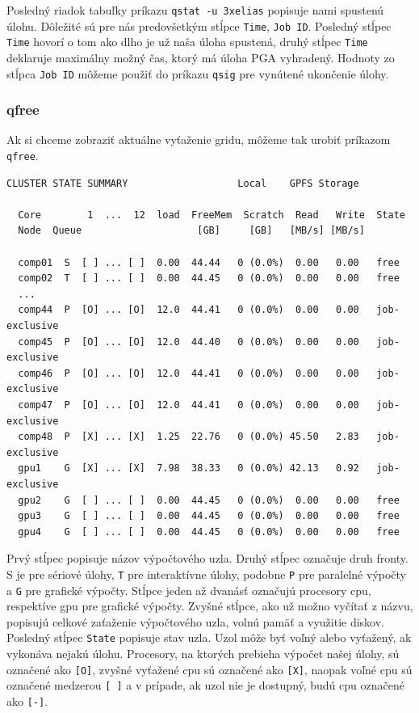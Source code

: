 Posledný riadok tabuľky príkazu \texttt{qstat -u 3xelias} popisuje nami spustenú úlohu.
Dôležité sú pre nás predovšetkým stĺpce \texttt{Time}, \texttt{Job ID}.
Posledný stĺpec \texttt{Time} hovorí o tom ako dlho je už naša úloha spustená, druhý stĺpec \texttt{Time} deklaruje maximálny možný čas,
ktorý má úloha PGA vyhradený. Hodnoty zo stĺpca \texttt{Job ID} môžeme použiť do príkazu \texttt{qsig} pre vynútené ukončenie úlohy.

\subsubsection{qfree}
Ak si chceme zobraziť aktuálne vyťaženie gridu, môžeme tak urobiť príkazom \texttt{qfree}.

\begin{lstlisting}[caption={qfree}]
  CLUSTER STATE SUMMARY                   Local    GPFS Storage
  
  Core        1  ...  12  load  FreeMem  Scratch  Read   Write  State
  Node  Queue                    [GB]     [GB]   [MB/s] [MB/s]
  
  comp01  S  [ ] ... [ ]  0.00  44.44   0 (0.0%)  0.00   0.00   free
  comp02  T  [ ] ... [ ]  0.00  44.45   0 (0.0%)  0.00   0.00   free
  ...
  comp44  P  [O] ... [O]  12.0  44.41   0 (0.0%)  0.00   0.00   job-exclusive
  comp45  P  [O] ... [O]  12.0  44.40   0 (0.0%)  0.00   0.00   job-exclusive
  comp46  P  [O] ... [O]  12.0  44.41   0 (0.0%)  0.00   0.00   job-exclusive
  comp47  P  [O] ... [O]  12.0  44.41   0 (0.0%)  0.00   0.00   job-exclusive
  comp48  P  [X] ... [X]  1.25  22.76   0 (0.0%) 45.50   2.83   job-exclusive
  gpu1    G  [X] ... [X]  7.98  38.33   0 (0.0%) 42.13   0.92   job-exclusive
  gpu2    G  [ ] ... [ ]  0.00  44.45   0 (0.0%)  0.00   0.00   free
  gpu3    G  [ ] ... [ ]  0.00  44.45   0 (0.0%)  0.00   0.00   free
  gpu4    G  [ ] ... [ ]  0.00  44.45   0 (0.0%)  0.00   0.00   free
\end{lstlisting}

Prvý stĺpec popisuje názov výpočtového uzla. Druhý stĺpec označuje druh fronty. S je pre sériové úlohy, \texttt{T} pre interaktívne úlohy,
podobne \texttt{P} pre paralelné výpočty a \texttt{G} pre grafické výpočty.
Stĺpce jeden až dvanásť označujú procesory \acrshort{cpu}, respektíve \acrshort{gpu} pre grafické výpočty.
Zvyšné stĺpce, ako už možno vyčítať z názvu, popisujú celkové zaťaženie výpočtového uzla, volnú pamäť a využitie diskov.
Posledný stĺpec \texttt{State} popisuje stav uzla. Uzol môže byť voľný alebo vyťažený, ak vykonáva nejakú úlohu.
Procesory, na ktorých prebieha výpočet našej úlohy, sú označené ako \texttt{[O]}, zvyšné vyťažené \acrshort{cpu} sú označené ako \texttt{[X]},
naopak voľné \acrshort{cpu} sú označené medzerou \texttt{[ ]} a v prípade, ak uzol nie je dostupný, budú \acrshort{cpu} označené ako \texttt{[-]}.

